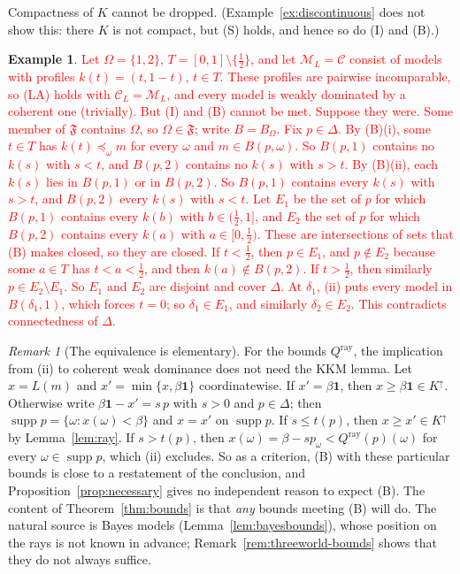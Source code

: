 \documentclass[11pt]{article}
\theoremstyle{definition}
\newtheorem{example}[theorem]{Example}
\theoremstyle{remark}
\newtheorem{remark}[theorem]{Remark}
\newcommand{\M}{\mathcal M}
\newcommand{\C}{\mathcal C}
\newcommand{\F}{\mathfrak F}
\newcommand{\one}{\mathbf 1}
\newcommand{\supp}{\operatorname{supp}}
\begin{document}
Compactness of $K$ cannot be dropped. (Example~\ref{ex:discontinuous} does not show this: there $K$ is not compact, but (S) holds, and hence so do (I) and (B).)
\begin{example}\label{ex:hole}
\textcolor{red}{Let $\Omega=\{1,2\}$, $T=[0,1]\setminus\{\tfrac12\}$, and let $\M_L=\C$ consist of models with profiles $k(t)=(t,1-t)$, $t\in T$. These profiles are pairwise incomparable, so (LA) holds with $\C_L=\M_L$, and every model is weakly dominated by a coherent one (trivially). But (I) and (B) cannot be met. Suppose they were. Some member of $\F$ contains $\Omega$, so $\Omega\in\F$; write $B=B_\Omega$. Fix $p\in\Delta$. By (B)(i), some $t\in T$ has $k(t)\preceq_\omega m$ for every $\omega$ and $m\in B(p,\omega)$. So $B(p,1)$ contains no $k(s)$ with $s<t$, and $B(p,2)$ contains no $k(s)$ with $s>t$. By (B)(ii), each $k(s)$ lies in $B(p,1)$ or in $B(p,2)$. So $B(p,1)$ contains every $k(s)$ with $s>t$, and $B(p,2)$ every $k(s)$ with $s<t$. Let $E_1$ be the set of $p$ for which $B(p,1)$ contains every $k(b)$ with $b\in(\tfrac12,1]$, and $E_2$ the set of $p$ for which $B(p,2)$ contains every $k(a)$ with $a\in[0,\tfrac12)$. These are intersections of sets that (B) makes closed, so they are closed. If $t<\tfrac12$, then $p\in E_1$, and $p\notin E_2$ because some $a\in T$ has $t<a<\tfrac12$, and then $k(a)\notin B(p,2)$. If $t>\tfrac12$, then similarly $p\in E_2\setminus E_1$. So $E_1$ and $E_2$ are disjoint and cover $\Delta$. At $\delta_1$, (ii) puts every model in $B(\delta_1,1)$, which forces $t=0$; so $\delta_1\in E_1$, and similarly $\delta_2\in E_2$. This contradicts connectedness of $\Delta$.}
\end{example}

\begin{remark}[The equivalence is elementary]\label{rem:elementary}
For the bounds $Q^{\mathrm{ray}}$, the implication from (ii) to coherent weak dominance does not need the KKM lemma. Let $x=L(m)$ and $x'=\min\{x,\beta\one\}$ coordinatewise. If $x'=\beta\one$, then $x\ge \beta\one\in K^\uparrow$. Otherwise write $\beta\one-x'=s\,p$ with $s>0$ and $p\in\Delta$; then $\supp p=\{\omega:x(\omega)<\beta\}$ and $x=x'$ on $\supp p$. If $s\le t(p)$, then $x\ge x'\in K^\uparrow$ by Lemma~\ref{lem:ray}. If $s>t(p)$, then $x(\omega)=\beta-sp_\omega<Q^{\mathrm{ray}}(p)(\omega)$ for every $\omega\in\supp p$, which (ii) excludes. So as a criterion, (B) with these particular bounds is close to a restatement of the conclusion, and Proposition~\ref{prop:necessary} gives no independent reason to expect (B). The content of Theorem~\ref{thm:bounds} is that \emph{any} bounds meeting (B) will do. The natural source is Bayes models (Lemma~\ref{lem:bayesbounds}), whose position on the rays is not known in advance; Remark~\ref{rem:threeworld-bounds} shows that they do not always suffice.
\end{remark}
\end{document}

